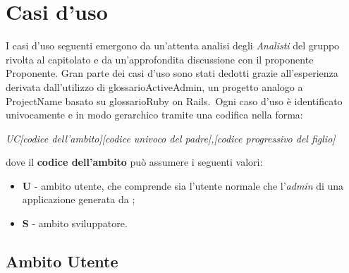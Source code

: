 \section{Casi d'uso}
I casi d'uso seguenti emergono da un'attenta analisi degli \textit{Analisti} del gruppo \GroupName{} rivolta al capitolato e da un'approfondita discussione con il proponente Proponente{}. Gran parte dei casi d'uso sono stati dedotti grazie all'esperienza derivata dall'utilizzo di glossario{ActiveAdmin}, un progetto analogo a ProjectName{} basato su glossario{Ruby on Rails}.\
Ogni caso d'uso è identificato univocamente e in modo gerarchico tramite una codifica nella forma:

\begin{center}

\textit{UC[codice dell'ambito][codice univoco del padre],[codice progressivo del figlio]}

\end{center} 

dove il \textbf{codice dell'ambito} può assumere i seguenti valori:

\begin{itemize}

  \item \textbf{U} - ambito utente, che comprende sia l'utente normale che l'\textit{admin} di una applicazione generata da \ProjectName{};
  \item \textbf{S} - ambito sviluppatore.

\end{itemize}


\subsection{Ambito Utente}

